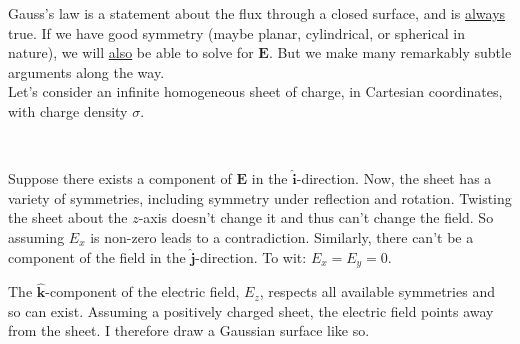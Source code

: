 \documentclass{article}
\numberwithin{equation}{section}
\newcommand{\ihat}{\mathbf{\hat{i}}}
\newcommand{\jhat}{\mathbf{\hat{j}}}
\newcommand{\khat}{\mathbf{\hat{k}}}
\newcommand{\bunny}[1][]{
    \tikz \fill [scale=1ex/500,yscale=1,#1] svg "M3831 8683 c-70 -71 -235 -358 -326 -567 -168 -385 -252 -748 -275 -1181 -5 -104 -9 -199 -7 -209 2 -16 -10 -21 -88 -36 -158 -31 -407 -112 -530 -173 -117 -58 -239 -150 -365 -277 -178 -177 -305 -366 -407 -604 -44 -102 -55 -118 -136 -201 -110 -113 -148 -183 -154 -288 -4 -53 0 -88 14 -132 12 -37 16 -70 12 -85 -4 -14 -7 -62 -8 -107 -3 -225 125 -386 369 -461 66 -20 157 -35 282 -47 l68 -7 -25 -47 c-41 -81 -59 -197 -52 -341 10 -200 66 -413 174 -660 153 -347 352 -632 640 -914 l104 -102 9 -95 c13 -131 12 -378 -1 -441 -25 -115 -92 -205 -180 -242 -138 -58 -168 -77 -220 -139 -92 -109 -110 -180 -63 -237 63 -75 165 -100 429 -107 159 -4 215 -2 275 11 267 57 455 273 539 619 20 84 29 107 41 103 8 -3 89 -37 179 -76 197 -86 466 -177 651 -220 74 -18 142 -34 150 -37 8 -3 -14 -15 -50 -28 -257 -88 -340 -205 -227 -319 48 -47 82 -58 257 -78 225 -26 1652 -9 1850 23 75 12 154 51 184 92 22 30 23 43 15 268 -3 65 0 83 25 133 50 102 131 161 255 187 46 9 67 8 150 -11 230 -54 428 -7 556 131 71 77 99 149 92 240 -7 115 -65 203 -185 282 -218 145 -282 308 -264 665 30 563 -100 1035 -383 1397 -78 99 -236 254 -335 327 -319 238 -731 392 -1245 468 -301 44 -438 49 -1090 37 -69 -2 -107 3 -160 20 l-70 22 3 238 c3 183 0 265 -12 356 -18 123 -53 275 -81 340 -16 38 -16 40 9 70 456 567 686 1088 725 1647 21 289 -41 691 -116 749 -28 23 -72 27 -106 10 -63 -31 -322 -342 -452 -541 -38 -59 -73 -108 -77 -108 -5 0 -8 11 -8 24 0 14 -9 74 -21 133 -44 228 -158 517 -217 547 -50 26 -80 20 -121 -21z";
}
\begin{document}
Gauss's law is a statement about the flux through a closed surface, and is \underline{always} true. If we have good symmetry (maybe planar, cylindrical, or spherical in nature), we will \underline{also} be able to solve for $\bm{E}$. But we make many remarkably subtle arguments along the way. \\

Let's consider an infinite homogeneous sheet of charge, in Cartesian coordinates, with charge density $\sigma$.

\begin{minipage}{0.4\textwidth}
\begin{flushleft}
\begin{figure}[H]
\label{fig:2:g}
\end{figure}
\end{flushleft}
\end{minipage}
~
\begin{minipage}{0.6\textwidth}
\begin{flushright}
\parbox[c]{\textwidth}{Suppose there exists a component of $\bm{E}$ in the $\ihat$-direction. Now, the sheet has a variety of symmetries, including symmetry under reflection and rotation. Twisting the sheet about the $z$-axis doesn't change it and thus can't change the field. So assuming $E_x$ is non-zero leads to a contradiction. Similarly, there can't be a component of the field in the $\jhat$-direction. To wit: $E_x = E_y = 0$.}
\end{flushright}
\end{minipage}

The $\khat$-component of the electric field, $E_z$, respects all available symmetries and so can exist. Assuming a positively charged sheet, the electric field points away from the sheet. I therefore draw a Gaussian surface like so.
\end{document}
